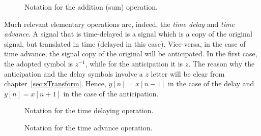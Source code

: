 \documentclass[\documentfontsize, twocolumn]{\classname}
\begin{document}
\begin{figure}[ht]
\begin{center}
\caption{Notation for the addition (sum) operation.}\label{tikz:addition-operation}
\end{center}
\end{figure}

Much relevant elementary operations are, indeed, the \emph{time delay} and
\emph{time advance}. A signal that is time-delayed is a signal which is a copy
of the original signal, but translated in time (delayed in this case).
Vice-versa, in the case of time advance, the signal copy of the original will be
anticipated. In the first case, the adopted symbol is $z^{-1}$, while for the
anticipation it is $z$. The reason why the anticipation and the delay symbols involve a $z$ letter will be clear from chapter~\ref{sec:zTransform}. Hence, $y[n] = x[n - 1]$ in the case of the delay and $y[n] = x[n + 1]$ in the case of the anticipation.

\begin{figure}[ht]
\begin{center}
    \caption{Notation for the time delaying operation.}\label{tikz:delaying-operation}
\end{center}
\end{figure}

\begin{figure}[ht]
\begin{center}
    \caption{Notation for the time advance operation.}\label{tikz:advance-operation}
\end{center}
\end{figure}
\end{document}
